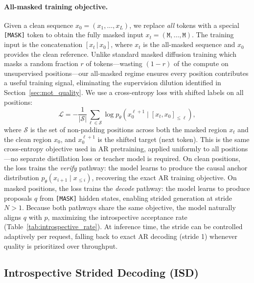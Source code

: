 \paragraph{All-masked training objective.}
Given a clean sequence $x_0 = (x_1, \ldots, x_L)$, we replace \emph{all} tokens with a special \texttt{[MASK]} token to obtain the fully masked input $x_t = (\texttt{M}, \ldots, \texttt{M})$. The training input is the concatenation $[x_t \,|\, x_0]$, where $x_t$ is the all-masked sequence and $x_0$ provides the clean reference. Unlike standard masked diffusion training which masks a random fraction $r$ of tokens---wasting $(1{-}r)$ of the compute on unsupervised positions---our all-masked regime ensures every position contributes a useful training signal, eliminating the supervision dilution identified in Section~\ref{sec:mot_quality}. We use a cross-entropy loss with shifted labels on all positions:
\begin{equation}
    \mathcal{L} = -\frac{1}{|\mathcal{S}|}\sum_{\ell \in \mathcal{S}} \log p_\theta(x_0^{\ell+1} \mid [x_t, x_0]_{\leq \ell}),
    \label{eq:loss}
\end{equation}
where $\mathcal{S}$ is the set of non-padding positions across both the masked region $x_t$ and the clean region $x_0$, and $x_0^{\ell+1}$ is the shifted target (next token). This is the same cross-entropy objective used in AR pretraining, applied uniformly to all positions---no separate distillation loss or teacher model is required. On clean positions, the loss trains the \emph{verify} pathway: the model learns to produce the causal anchor distribution $p_\theta(x_{i+1} \mid x_{\leq i})$, recovering the exact AR training objective. On masked positions, the loss trains the \emph{decode} pathway: the model learns to produce proposals $q$ from \texttt{[MASK]} hidden states, enabling strided generation at stride $N > 1$. Because both pathways share the same objective, the model naturally aligns $q$ with $p$, maximizing the introspective acceptance rate (Table~\ref{tab:introspective_rate}). At inference time, the stride can be controlled adaptively per request, falling back to exact AR decoding (stride 1) whenever quality is prioritized over throughput.


\subsection{Introspective Strided Decoding (ISD)}
\label{sec:inference}

